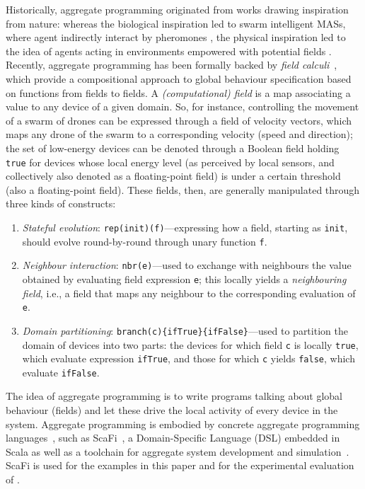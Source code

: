 Historically, aggregate programming originated from works drawing inspiration from nature: whereas the biological inspiration led to swarm intelligent MASs, where agent indirectly interact by pheromones \cite{DBLP:conf/atal/ParunakBS02}, the physical inspiration led to the idea of agents acting in environments empowered with potential fields \cite{DBLP:books/daglib/0015276}.
%
Recently, aggregate programming has been formally backed by 
 \emph{field calculi}~\cite{viroli2019jlamp-si-coord},
 which provide a compositional approach
 to global behaviour specification
 based on functions from fields to fields.
%
A \emph{(computational) field} is a map associating a value to any device of a given domain.
%
So, for instance, controlling the movement of a swarm of drones
 can be expressed through a field of velocity vectors,
 which maps any drone of the swarm to a corresponding 
 velocity (speed and direction);
 the set of low-energy devices can be denoted through a Boolean
  field holding \texttt{true} for devices whose local energy level (as perceived by local sensors, and collectively also denoted as a floating-point field)
  is under a certain threshold (also a floating-point field).
%
These fields, then, are generally manipulated through 
 three kinds of constructs:
\begin{enumerate}
\item \emph{Stateful evolution}: \lstinline|rep(init)(f)|---expressing how a field, starting as \lstinline|init|, should evolve round-by-round through unary function \lstinline|f|.
\item \emph{Neighbour interaction}: \lstinline|nbr(e)|---used to exchange with neighbours the value obtained by evaluating field expression \lstinline|e|; this locally yields a \emph{neighbouring field}, i.e., a field that maps any neighbour to the corresponding evaluation of \lstinline|e|.
\item \emph{Domain partitioning}: \lstinline|branch(c){ifTrue}{ifFalse}|---used to partition the domain of devices into two parts: the devices for which field \lstinline|c| is locally \lstinline|true|, which evaluate expression \lstinline|ifTrue|, and those for which \lstinline|c| yields \lstinline|false|, which evaluate \lstinline|ifFalse|. 
\end{enumerate}
%
The idea of aggregate programming is to 
 write programs talking about global behaviour (fields)
 and let these drive the local activity of every device in the system.
%
Aggregate programming is embodied by concrete aggregate programming languages~\cite{viroli2019jlamp-si-coord},
 such as ScaFi~\cite{DBLP:conf/isola/CasadeiVAD20,DBLP:journals/eaai/CasadeiVAPD21},
 a Domain-Specific Language (DSL) embedded in Scala
 as well as a toolchain for aggregate system development and simulation~\cite{Casadei2016mass}.
%
ScaFi is used for the examples in this paper and for the experimental evaluation of .

